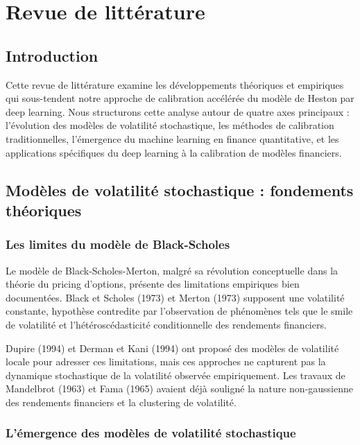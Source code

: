 \chapter{Revue de littérature}

\section{Introduction}

Cette revue de littérature examine les développements théoriques et empiriques qui sous-tendent notre approche de calibration accélérée du modèle de Heston par deep learning. Nous structurons cette analyse autour de quatre axes principaux : l'évolution des modèles de volatilité stochastique, les méthodes de calibration traditionnelles, l'émergence du machine learning en finance quantitative, et les applications spécifiques du deep learning à la calibration de modèles financiers.

\section{Modèles de volatilité stochastique : fondements théoriques}

\subsection{Les limites du modèle de Black-Scholes}

Le modèle de Black-Scholes-Merton, malgré sa révolution conceptuelle dans la théorie du pricing d'options, présente des limitations empiriques bien documentées. Black et Scholes (1973) et Merton (1973) supposent une volatilité constante, hypothèse contredite par l'observation de phénomènes tels que le smile de volatilité et l'hétéroscédasticité conditionnelle des rendements financiers.

Dupire (1994) et Derman et Kani (1994) ont proposé des modèles de volatilité locale pour adresser ces limitations, mais ces approches ne capturent pas la dynamique stochastique de la volatilité observée empiriquement. Les travaux de Mandelbrot (1963) et Fama (1965) avaient déjà souligné la nature non-gaussienne des rendements financiers et la clustering de volatilité.

\subsection{L'émergence des modèles de volatilité stochastique}

